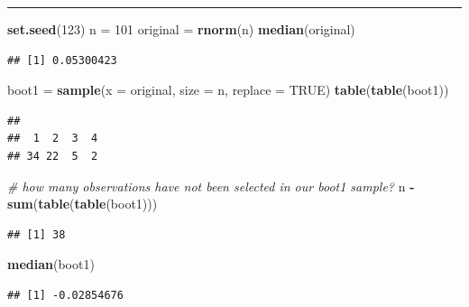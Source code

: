 \documentclass[]{article}
\newenvironment{Shaded}{\begin{snugshade}}{\end{snugshade}}
\newcommand{\CommentTok}[1]{\textcolor[rgb]{0.56,0.35,0.01}{\textit{#1}}}
\newcommand{\DataTypeTok}[1]{\textcolor[rgb]{0.13,0.29,0.53}{#1}}
\newcommand{\DecValTok}[1]{\textcolor[rgb]{0.00,0.00,0.81}{#1}}
\newcommand{\KeywordTok}[1]{\textcolor[rgb]{0.13,0.29,0.53}{\textbf{#1}}}
\newcommand{\NormalTok}[1]{#1}
\newcommand{\OperatorTok}[1]{\textcolor[rgb]{0.81,0.36,0.00}{\textbf{#1}}}
\newcommand{\OtherTok}[1]{\textcolor[rgb]{0.56,0.35,0.01}{#1}}
\newcommand{\StringTok}[1]{\textcolor[rgb]{0.31,0.60,0.02}{#1}}
\begin{document}
\begin{center}\rule{0.5\linewidth}{\linethickness}\end{center}

\begin{Shaded}
\begin{Highlighting}[]
\KeywordTok{set.seed}\NormalTok{(}\DecValTok{123}\NormalTok{)}
\NormalTok{n =}\StringTok{ }\DecValTok{101}
\NormalTok{original =}\StringTok{ }\KeywordTok{rnorm}\NormalTok{(n)}
\KeywordTok{median}\NormalTok{(original)}
\end{Highlighting}
\end{Shaded}

\begin{verbatim}
## [1] 0.05300423
\end{verbatim}

\begin{Shaded}
\begin{Highlighting}[]
\NormalTok{boot1 =}\StringTok{ }\KeywordTok{sample}\NormalTok{(}\DataTypeTok{x =}\NormalTok{ original, }\DataTypeTok{size =}\NormalTok{ n, }\DataTypeTok{replace =} \OtherTok{TRUE}\NormalTok{)}
\KeywordTok{table}\NormalTok{(}\KeywordTok{table}\NormalTok{(boot1))}
\end{Highlighting}
\end{Shaded}

\begin{verbatim}
## 
##  1  2  3  4 
## 34 22  5  2
\end{verbatim}

\begin{Shaded}
\begin{Highlighting}[]
\CommentTok{# how many observations have not been selected in our boot1 sample?}
\NormalTok{n }\OperatorTok{-}\StringTok{ }\KeywordTok{sum}\NormalTok{(}\KeywordTok{table}\NormalTok{(}\KeywordTok{table}\NormalTok{(boot1)))}
\end{Highlighting}
\end{Shaded}

\begin{verbatim}
## [1] 38
\end{verbatim}

\begin{Shaded}
\begin{Highlighting}[]
\KeywordTok{median}\NormalTok{(boot1)}
\end{Highlighting}
\end{Shaded}

\begin{verbatim}
## [1] -0.02854676
\end{verbatim}
\end{document}
